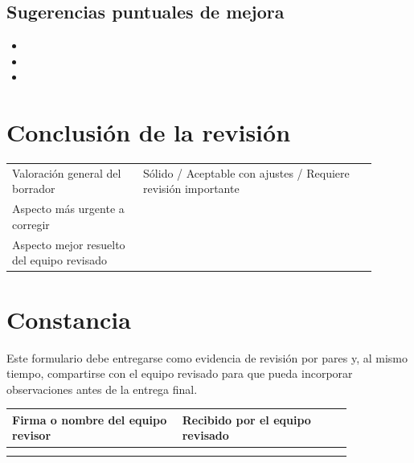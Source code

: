 \documentclass[11pt]{article}
\begin{document}
\subsection*{Sugerencias puntuales de mejora}
\begin{itemize}
\item
\item
\item
\end{itemize}

\section{Conclusi\'on de la revisi\'on}
\begin{tabular}{p{0.32\linewidth} p{0.58\linewidth}}
\toprule
Valoraci\'on general del borrador & S\'olido / Aceptable con ajustes / Requiere revisi\'on importante \\
Aspecto m\'as urgente a corregir & \\
Aspecto mejor resuelto del equipo revisado & \\
\bottomrule
\end{tabular}

\section{Constancia}
\begin{warnbox}
Este formulario debe entregarse como evidencia de revisi\'on por pares y, al mismo tiempo, compartirse con el equipo revisado para que pueda incorporar observaciones antes de la entrega final.
\end{warnbox}

\begin{tabular}{p{0.42\linewidth} p{0.42\linewidth}}
\toprule
Firma o nombre del equipo revisor & Recibido por el equipo revisado \\
\midrule
 & \\
 & \\
\bottomrule
\end{tabular}
\end{document}
